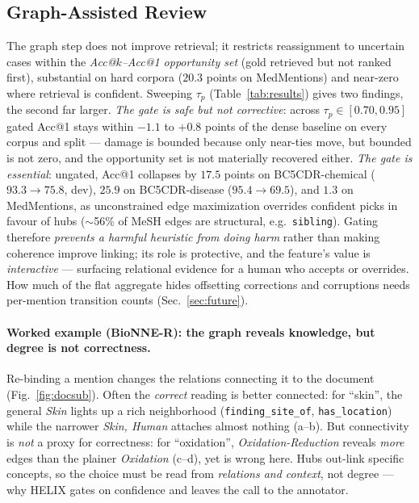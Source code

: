 \documentclass[runningheads]{llncs}
\begin{document}
\subsection{Graph-Assisted Review}
\label{sec:graphresults}
The graph step does not improve retrieval; it restricts reassignment to uncertain
cases within the \emph{Acc@$k$--Acc@1 opportunity set} (gold retrieved but not ranked
first), substantial on hard corpora ($20.3$ points on MedMentions) and near-zero
where retrieval is confident. Sweeping $\tau_p$ (Table~\ref{tab:results}) gives two
findings, the second far larger. \emph{The gate is safe but not corrective}: across
$\tau_p\in[0.70,0.95]$ gated Acc@1 stays within $-1.1$ to $+0.8$ points of the dense
baseline on every corpus and split --- damage is bounded because only near-ties move,
but bounded is not zero, and the opportunity set is not materially recovered either.
\emph{The gate is essential}: ungated, Acc@1 collapses by $17.5$ points on
BC5CDR-chemical ($93.3\rightarrow75.8$, dev), $25.9$ on BC5CDR-disease
($95.4\rightarrow69.5$), and $1.3$ on MedMentions, as unconstrained edge maximization
overrides confident picks in favour of hubs ($\sim$56\% of MeSH edges are structural,
e.g.\ \texttt{sibling}). Gating therefore \emph{prevents a harmful heuristic from
doing harm} rather than making coherence improve linking; its role is protective, and
the feature's value is \emph{interactive} --- surfacing relational evidence for a
human who accepts or overrides. How much of the flat aggregate hides offsetting
corrections and corruptions needs per-mention transition counts
(Sec.~\ref{sec:future}).

\paragraph{Worked example (BioNNE-R): the graph reveals knowledge, but degree is not
correctness.}
Re-binding a mention changes the relations connecting it to the document
(Fig.~\ref{fig:docsub}). Often the \emph{correct} reading is better connected: for
``skin'', the general \emph{Skin} lights up a rich neighborhood
(\texttt{finding\_site\_of}, \texttt{has\_location}) while the narrower \emph{Skin,
Human} attaches almost nothing (a--b). But connectivity is \emph{not} a proxy for
correctness: for ``oxidation'', \emph{Oxidation-Reduction} reveals \emph{more} edges
than the plainer \emph{Oxidation} (c--d), yet is wrong here. Hubs out-link specific
concepts, so the choice must be read from \emph{relations and context}, not degree
--- why HELIX gates on confidence and leaves the call to the annotator.
\end{document}
